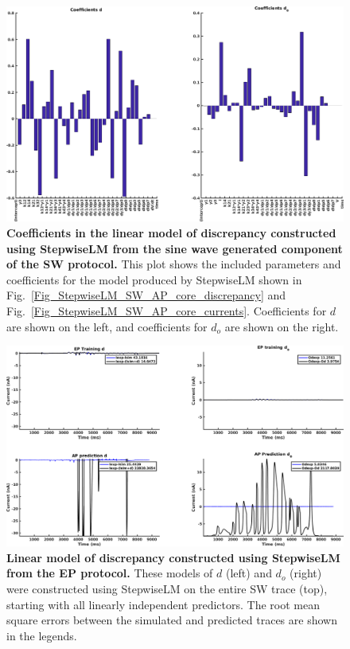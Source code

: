 \documentclass[11pt,a4paper,oneside]{article}
\begin{document}
\clearpage

\begin{figure}[t]
\begin{center}
\includegraphics[scale=0.42]{Figures/StepwiseLM_SW_AP_core_coefficients.png}
\caption{\textbf{Coefficients in the linear model of discrepancy constructed using StepwiseLM from the sine wave generated component of the SW protocol.} This plot shows the included parameters and coefficients for the model produced by StepwiseLM shown in Fig.~\ref{Fig_StepwiseLM_SW_AP_core_discrepancy} and Fig.~\ref{Fig_StepwiseLM_SW_AP_core_currents}. Coefficients for $d$ are shown on the left, and coefficients for $d_o$ are shown on the right.} 
\label{Fig_StepwiseLM_SW_AP_core_coefficients}
\end{center}
\end{figure}

\clearpage

\begin{figure}[t]
\begin{center}
\includegraphics[scale=0.42]{Figures/StepwiseLM_EP_AP_full_discrepancy.png}
\caption{\textbf{Linear model of discrepancy constructed using StepwiseLM from the EP protocol.} These models of $d$ (left) and $d_o$ (right) were constructed using StepwiseLM on the entire SW trace (top), starting with all linearly independent predictors. The root mean square errors between the simulated and predicted traces are shown in the legends. } 
\label{Fig_StepwiseLM_EP_AP_full_discrepancy}
\end{center}
\end{figure}
\end{document}
